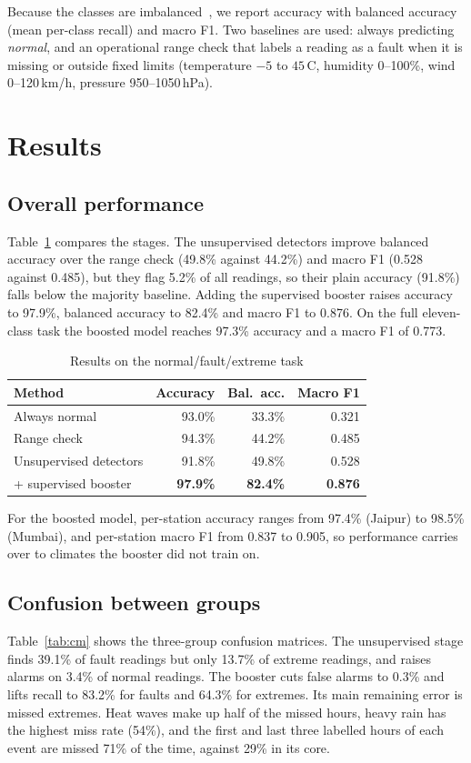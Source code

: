 \documentclass[conference]{IEEEtran}
\begin{document}
Because the classes are imbalanced~\cite{he2009}, we report accuracy with balanced accuracy (mean
per-class recall) and macro F1. Two baselines are used: always predicting \emph{normal}, and an
operational range check that labels a reading as a fault when it is missing or outside fixed limits
(temperature $-5$ to $45$\,\textdegree C, humidity 0--100\%, wind 0--120\,km/h, pressure
950--1050\,hPa).

\section{Results}
\subsection{Overall performance}
Table~\ref{tab:main} compares the stages. The unsupervised detectors improve balanced accuracy over
the range check (49.8\% against 44.2\%) and macro F1 (0.528 against 0.485), but they flag 5.2\% of
all readings, so their plain accuracy (91.8\%) falls below the majority baseline. Adding the
supervised booster raises accuracy to 97.9\%, balanced accuracy to 82.4\% and macro F1 to 0.876. On
the full eleven-class task the boosted model reaches 97.3\% accuracy and a macro F1 of 0.773.

\begin{table}[t]
\caption{Results on the normal/fault/extreme task}
\label{tab:main}
\centering
\begin{tabular}{@{}lrrr@{}}
\toprule
Method & Accuracy & Bal.\ acc. & Macro F1 \\
\midrule
Always normal              & 93.0\% & 33.3\% & 0.321 \\
Range check                & 94.3\% & 44.2\% & 0.485 \\
Unsupervised detectors     & 91.8\% & 49.8\% & 0.528 \\
\quad + supervised booster & \textbf{97.9\%} & \textbf{82.4\%} & \textbf{0.876} \\
\bottomrule
\end{tabular}
\end{table}

For the boosted model, per-station accuracy ranges from 97.4\% (Jaipur) to 98.5\% (Mumbai), and
per-station macro F1 from 0.837 to 0.905, so performance carries over to climates the booster did not
train on.

\subsection{Confusion between groups}
Table~\ref{tab:cm} shows the three-group confusion matrices. The unsupervised stage finds 39.1\% of
fault readings but only 13.7\% of extreme readings, and raises alarms on 3.4\% of normal readings.
The booster cuts false alarms to 0.3\% and lifts recall to 83.2\% for faults and 64.3\% for
extremes. Its main remaining error is missed extremes. Heat waves make up half of the missed hours,
heavy rain has the highest miss rate (54\%), and the first and last three labelled hours of each event
are missed 71\% of the time, against 29\% in its core.
\end{document}
